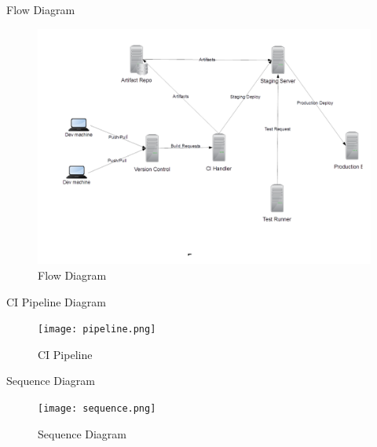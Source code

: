 \documentclass{beamer}
\begin{document}
\begin{frame}{Flow Diagram}

\begin{figure}[h]
\begin{center}
\includegraphics[scale=0.28]{flow1.png}
\caption{Flow Diagram}
\end{center}
\end{figure}
\end{frame}

\begin{frame}{CI Pipeline Diagram}

\begin{figure}[h]
\begin{center}
\texttt{[image: pipeline.png]}
\caption{CI Pipeline}
\end{center}
\end{figure}
\end{frame}

\begin{frame}{Sequence Diagram}

\begin{figure}[h]
\begin{center}
\texttt{[image: sequence.png]}
\caption{Sequence Diagram}
\end{center}
\end{figure}
\end{frame}
\end{document}

